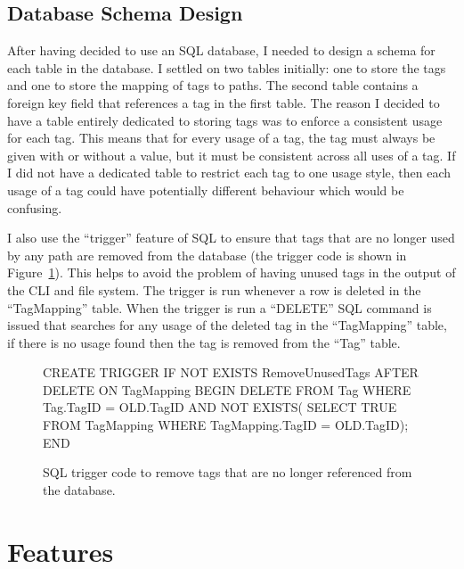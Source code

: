 \subsection{Database Schema Design}

After having decided to use an SQL database, I needed to design a schema for
each table in the database. I settled on two tables initially: one to store the
tags and one to store the mapping of tags to paths. The second table contains a
foreign key field that references a tag in the first table.
The reason I decided to have a table entirely dedicated to storing tags was to
enforce a consistent usage for each tag. This means that for every usage of a
tag, the tag must always be given with or without a value, but it must be
consistent across all uses of a tag. If I did not have a dedicated table to
restrict each tag to one usage style, then each usage of a tag could have
potentially different behaviour which would be confusing.

I also use the ``trigger'' feature of SQL to ensure that tags that are no
longer used by any path are removed from the database (the trigger code is
shown in Figure~\ref{fig:sql-trigger}). This helps to avoid the problem of
having unused tags in the output of the CLI and file system. The trigger is run
whenever a row is deleted in the ``TagMapping'' table. When the trigger is run
a ``DELETE'' SQL command is issued that searches for any usage of the deleted
tag in the ``TagMapping'' table, if there is no usage found then the tag is
removed from the ``Tag'' table.

\begin{figure}[h]
    \centering
    \begin{boxedverbatim}

CREATE TRIGGER IF NOT EXISTS
RemoveUnusedTags AFTER DELETE ON TagMapping
BEGIN
  DELETE FROM Tag
  WHERE
    Tag.TagID = OLD.TagID
    AND NOT EXISTS(
      SELECT TRUE
      FROM TagMapping
      WHERE TagMapping.TagID = OLD.TagID);
END
    \end{boxedverbatim}
    \caption[SQL Trigger Code]{SQL trigger code to remove tags that are no
    longer referenced from the database.}
    \label{fig:sql-trigger}
\end{figure}

\section{Features}
\label{section:features}

